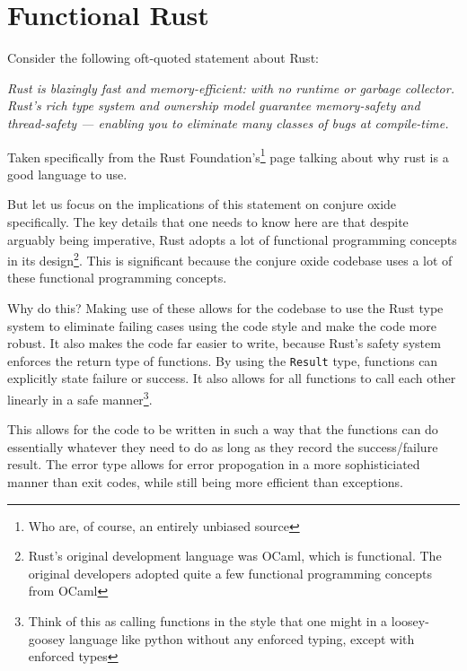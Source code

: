 \section{Functional Rust}

Consider the following oft-quoted statement about Rust:

\textit{Rust is blazingly fast and memory-efficient: with no runtime or garbage collector. Rust's rich type system and ownership model guarantee memory-safety and thread-safety — enabling you to eliminate many classes of bugs at compile-time.}

Taken specifically from the Rust Foundation's\footnote{Who are, of course, an entirely unbiased source} page talking about why rust is a good language to use. 

But let us focus on the implications of this statement on conjure oxide specifically. The key details that one needs to know here are that despite arguably being imperative, Rust adopts a lot of functional programming concepts in its design\footnote{Rust's original development language was OCaml, which is functional. The original developers adopted quite a few functional programming concepts from OCaml}. This is significant because the conjure oxide codebase uses a lot of these functional programming concepts. 

Why do this? Making use of these allows for the codebase to use the Rust type system to eliminate failing cases using the code style and make the code more robust. It also makes the code far easier to write, because Rust's safety system enforces the return type of functions. By using the \texttt{Result} type, functions can explicitly state failure or success. It also allows for all functions to call each other linearly in a safe manner\footnote{Think of this as calling functions in the style that one might in a loosey-goosey language like python without any enforced typing, except with enforced types}. 

This allows for the code to be written in such a way that the functions can do essentially whatever they need to do as long as they record the success/failure result. The error type allows for error propogation in a more sophisticiated manner than exit codes, while still being more efficient than exceptions. 